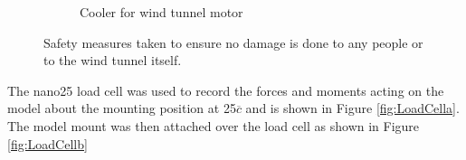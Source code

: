 \begin{figure}[H]
\begin{subfigure}[b]{0.4\textwidth}
                \caption{Cooler for wind tunnel motor}
                \label{fig:engineCooler}
     \end{subfigure}
     \caption{Safety measures taken to ensure no damage is done to any people or to the wind tunnel itself.}
     \label{fig:windTunnelSafety}
\end{figure}


The nano25 load cell was used to record the forces and moments acting on the model about the mounting position at 25$\overline{c}$ and is shown in Figure \ref{fig:LoadCella}. The model mount was then attached over the load cell as shown in Figure \ref{fig:LoadCellb}

